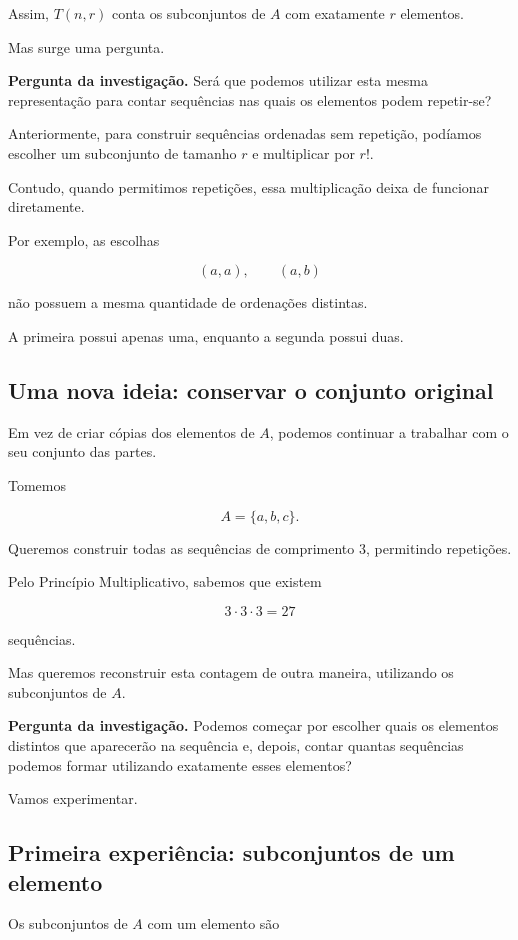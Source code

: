 \documentclass[11pt,a4paper,oneside]{book}
\newcommand{\Pergunta}[1]{\begin{perguntabox}\textbf{Pergunta da investigação.} #1\end{perguntabox}}
\begin{document}
Assim, $T(n,r)$ conta os subconjuntos de $A$ com
exatamente $r$ elementos.

Mas surge uma pergunta.

\Pergunta{Será que podemos utilizar esta mesma
representação para contar sequências nas quais
os elementos podem repetir-se?}

Anteriormente, para construir sequências ordenadas
sem repetição, podíamos escolher um subconjunto
de tamanho $r$ e multiplicar por $r!$.

Contudo, quando permitimos repetições, essa
multiplicação deixa de funcionar diretamente.

Por exemplo, as escolhas

\[
(a,a),\qquad (a,b)
\]

não possuem a mesma quantidade de ordenações distintas.

A primeira possui apenas uma, enquanto a segunda
possui duas.

\subsection*{Uma nova ideia: conservar o conjunto original}

Em vez de criar cópias dos elementos de $A$,
podemos continuar a trabalhar com o seu conjunto
das partes.

Tomemos

\[
A=\{a,b,c\}.
\]

Queremos construir todas as sequências de comprimento
$3$, permitindo repetições.

Pelo Princípio Multiplicativo, sabemos que existem

\[
3\cdot3\cdot3=27
\]

sequências.

Mas queremos reconstruir esta contagem de outra maneira,
utilizando os subconjuntos de $A$.

\Pergunta{Podemos começar por escolher quais os
elementos distintos que aparecerão na sequência
e, depois, contar quantas sequências podemos formar
utilizando exatamente esses elementos?}

Vamos experimentar.

\subsection*{Primeira experiência: subconjuntos de um elemento}

Os subconjuntos de $A$ com um elemento são
\end{document}
